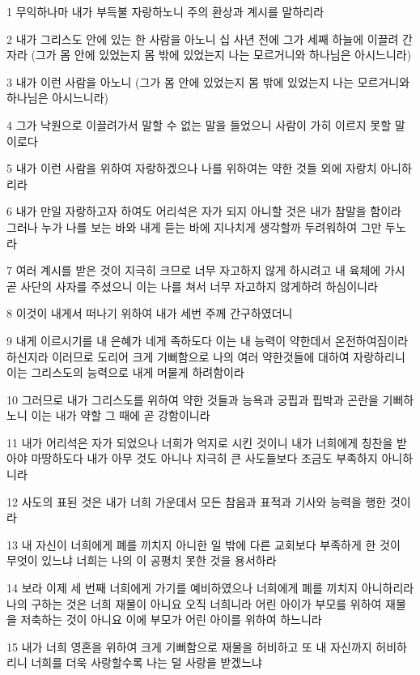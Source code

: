 \par 1 무익하나마 내가 부득불 자랑하노니 주의 환상과 계시를 말하리라
\par 2 내가 그리스도 안에 있는 한 사람을 아노니 십 사년 전에 그가 세째 하늘에 이끌려 간 자라 (그가 몸 안에 있었는지 몸 밖에 있었는지 나는 모르거니와 하나님은 아시느니라)
\par 3 내가 이런 사람을 아노니 (그가 몸 안에 있었는지 몸 밖에 있었는지 나는 모르거니와 하나님은 아시느니라)
\par 4 그가 낙원으로 이끌려가서 말할 수 없는 말을 들었으니 사람이 가히 이르지 못할 말이로다
\par 5 내가 이런 사람을 위하여 자랑하겠으나 나를 위하여는 약한 것들 외에 자랑치 아니하리라
\par 6 내가 만일 자랑하고자 하여도 어리석은 자가 되지 아니할 것은 내가 참말을 함이라 그러나 누가 나를 보는 바와 내게 듣는 바에 지나치게 생각할까 두려워하여 그만 두노라
\par 7 여러 계시를 받은 것이 지극히 크므로 너무 자고하지 않게 하시려고 내 육체에 가시 곧 사단의 사자를 주셨으니 이는 나를 쳐서 너무 자고하지 않게하려 하심이니라
\par 8 이것이 내게서 떠나기 위하여 내가 세번 주께 간구하였더니
\par 9 내게 이르시기를 내 은혜가 네게 족하도다 이는 내 능력이 약한데서 온전하여짐이라 하신지라 이러므로 도리어 크게 기뻐함으로 나의 여러 약한것들에 대하여 자랑하리니 이는 그리스도의 능력으로 내게 머물게 하려함이라
\par 10 그러므로 내가 그리스도를 위하여 약한 것들과 능욕과 궁핍과 핍박과 곤란을 기뻐하노니 이는 내가 약할 그 때에 곧 강함이니라
\par 11 내가 어리석은 자가 되었으나 너희가 억지로 시킨 것이니 내가 너희에게 칭찬을 받아야 마땅하도다 내가 아무 것도 아니나 지극히 큰 사도들보다 조금도 부족하지 아니하니라
\par 12 사도의 표된 것은 내가 너희 가운데서 모든 참음과 표적과 기사와 능력을 행한 것이라
\par 13 내 자신이 너희에게 폐를 끼치지 아니한 일 밖에 다른 교회보다 부족하게 한 것이 무엇이 있느냐 너희는 나의 이 공평치 못한 것을 용서하라
\par 14 보라 이제 세 번째 너희에게 가기를 예비하였으나 너희에게 폐를 끼치지 아니하리라 나의 구하는 것은 너희 재물이 아니요 오직 너희니라 어린 아이가 부모를 위하여 재물을 저축하는 것이 아니요 이에 부모가 어린 아이를 위하여 하느니라
\par 15 내가 너희 영혼을 위하여 크게 기뻐함으로 재물을 허비하고 또 내 자신까지 허비하리니 너희를 더욱 사랑할수록 나는 덜 사랑을 받겠느냐
